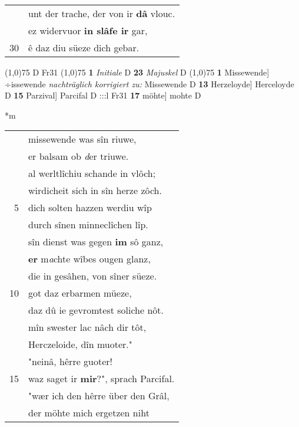 \documentclass[8pt,a4paper,notitlepage]{article}
\begin{document}
\begin{table}[ht]
\begin{minipage}[t]{0.5\linewidth}
\begin{tabular}{rl}
 & unt der trache, der von ir \textbf{dâ} vlouc.\\ 
 & ez widervuor \textbf{in slâfe ir} gar,\\ 
30 & ê daz diu süeze dich gebar.\\ 
\end{tabular}
\scriptsize
\line(1,0){75} \newline
D Fr31 \newline
\line(1,0){75} \newline
\textbf{1} \textit{Initiale} D  \textbf{23} \textit{Majuskel} D  \newline
\line(1,0){75} \newline
\textbf{1} Missewende] ÷issewende \textit{nachträglich korrigiert zu:} Missewende D \textbf{13} Herzeloyde] Herceloyde D \textbf{15} Parzival] Parcifal D :::l Fr31 \textbf{17} möhte] mohte D \newline
\end{minipage}
\hspace{0.5cm}
\begin{minipage}[t]{0.5\linewidth}
\small
\begin{center}*m
\end{center}
\begin{tabular}{rl}
 & missewende was sîn riuwe,\\ 
 & er balsam ob \textit{d}er triuwe.\\ 
 & al werltlîchiu schande in vlôch;\\ 
 & wirdicheit sich in sîn herze zôch.\\ 
5 & dich solten hazzen werdiu wîp\\ 
 & durch sînen minneclîchen lîp.\\ 
 & sîn dienst was gegen \textbf{im} sô ganz,\\ 
 & \textbf{er} m\textit{a}chte wîbes ougen glanz,\\ 
 & die in gesâhen, von sîner süeze.\\ 
10 & got daz erbarmen müeze,\\ 
 & daz dû ie gevromtest soliche nôt.\\ 
 & mîn swester lac nâch dir tôt,\\ 
 & Herczeloide, dîn muoter."\\ 
 & "neinâ, hêrre guoter!\\ 
15 & waz saget ir \textbf{mir}?", sprach Parcifal.\\ 
 & "wær ich den hêrre über den Grâl,\\ 
 & der möhte mich ergetzen niht\\ 

\end{tabular}
\end{minipage}
\end{table}
\end{document}
